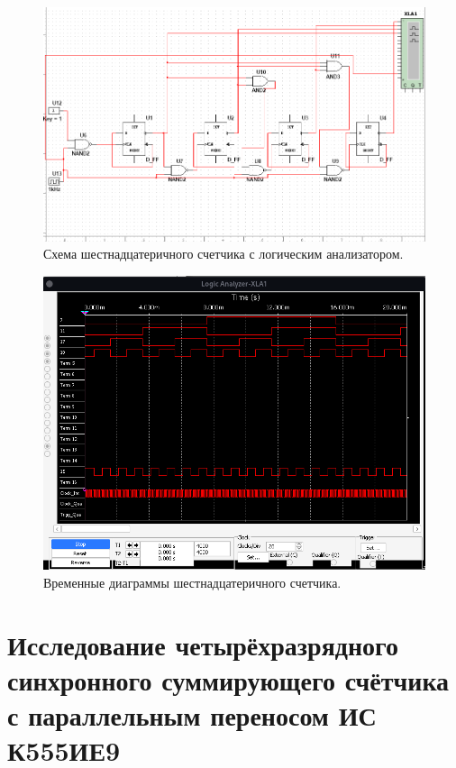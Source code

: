 \begin{figure}[ht]
    \centering
    \includegraphics[width=\linewidth]{img/sc7.png}
    \caption{Схема шестнадцатеричного счетчика с логическим анализатором.}
    \label{sc7}
\end{figure}

\begin{figure}[ht]
    \centering
    \includegraphics[width=\linewidth]{img/sc8.png}
    \caption{Временные диаграммы шестнадцатеричного счетчика.}
    \label{sc8}
\end{figure}


\clearpage

\section{Исследование четырёхразрядного синхронного суммирующего счётчика с параллельным переносом ИС К555ИЕ9}

